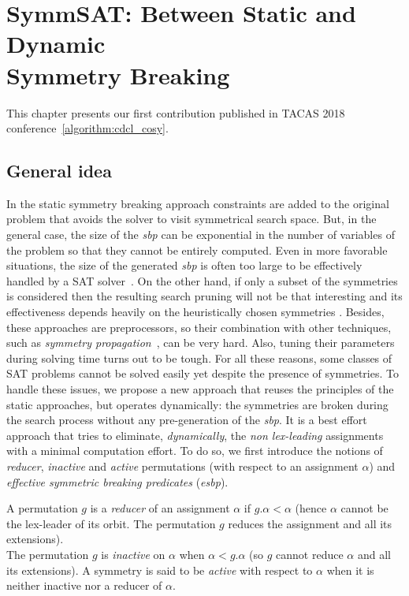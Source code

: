 \chapter{SymmSAT: Between Static and Dynamic\\ Symmetry Breaking}\label{chap:symmSAT}
\minitoc
This chapter presents our first contribution published in TACAS 2018 conference~\ref{algorithm:cdcl_cosy}. 
\section{General idea}
In the static symmetry breaking approach constraints are added to the original 
problem that avoids the solver to visit symmetrical search space.
But, in the general case,
the size of the \textit{sbp} can be exponential in the number of variables of
the problem so that they cannot be entirely computed. Even in more favorable
situations, the size of the generated \textit{sbp} is often too large to be
effectively handled by a SAT solver~\cite{Luks2004}. On the other hand, if
only a subset of the symmetries is considered then the resulting search pruning
will not be that interesting and its effectiveness depends heavily on the
heuristically chosen symmetries \cite{biere2009handbook}. Besides, these approaches
are preprocessors, so their combination with other techniques, such as
\emph{symmetry propagation}~\cite{Devriendt12}, can be very hard. Also, tuning
their parameters during  solving time turns out to be tough. For all
these reasons, some classes of SAT problems cannot be solved easily yet despite
the presence of symmetries.
To handle these issues, we propose a new
approach that reuses the principles of the static approaches, but operates
dynamically: the symmetries are broken during the search process without any
pre-generation of the \textit{sbp}. It is a best effort approach that tries to eliminate,
\textit{dynamically}, the \textit{non lex-leading} assignments with a minimal
computation effort. To do so, we first introduce the notions of
\textit{reducer}, \textit{inactive} and \textit{active} permutations (with
respect to an assignment $\alpha$) and \emph{effective symmetric breaking predicates} (\emph{esbp}).
\begin{definition}
  A permutation $g$ is a \emph{reducer} of an assignment $\alpha$ if $g.\alpha < \alpha$ 
  (hence $\alpha$ cannot be the lex-leader of its orbit. The permutation  $g$ reduces the assignment and all its extensions).\\
 The permutation $g$ is \emph{inactive} on $\alpha$ when $\alpha < g.\alpha$ (so $g$ cannot reduce $\alpha$ and all
 its extensions). A symmetry is said to be \emph{active} with respect to $\alpha$
 when it is neither inactive nor a reducer of $\alpha$. 
\end{definition}
